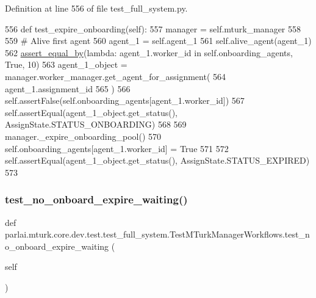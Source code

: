Definition at line 556 of file test\+\_\+full\+\_\+system.\+py.


\begin{DoxyCode}
556     \textcolor{keyword}{def }test\_expire\_onboarding(self):
557         manager = self.mturk\_manager
558 
559         \textcolor{comment}{# Alive first agent}
560         agent\_1 = self.agent\_1
561         self.alive\_agent(agent\_1)
562         \hyperlink{namespaceparlai_1_1mturk_1_1core_1_1test_1_1test__full__system_a0b463246d35658a2e422010f13dcf819}{assert\_equal\_by}(\textcolor{keyword}{lambda}: agent\_1.worker\_id \textcolor{keywordflow}{in} self.onboarding\_agents, \textcolor{keyword}{True}, 10)
563         agent\_1\_object = manager.worker\_manager.get\_agent\_for\_assignment(
564             agent\_1.assignment\_id
565         )
566         self.assertFalse(self.onboarding\_agents[agent\_1.worker\_id])
567         self.assertEqual(agent\_1\_object.get\_status(), AssignState.STATUS\_ONBOARDING)
568 
569         manager.\_expire\_onboarding\_pool()
570         self.onboarding\_agents[agent\_1.worker\_id] = \textcolor{keyword}{True}
571 
572         self.assertEqual(agent\_1\_object.get\_status(), AssignState.STATUS\_EXPIRED)
573 
\end{DoxyCode}
\mbox{\label{classparlai_1_1mturk_1_1core_1_1dev_1_1test_1_1test__full__system_1_1TestMTurkManagerWorkflows_aea7f86b35f032a0f71f92b6e1a207a61}} 
\subsubsection{\texorpdfstring{test\+\_\+no\+\_\+onboard\+\_\+expire\+\_\+waiting()}{test\_no\_onboard\_expire\_waiting()}}
{\footnotesize\ttfamily def parlai.\+mturk.\+core.\+dev.\+test.\+test\+\_\+full\+\_\+system.\+Test\+M\+Turk\+Manager\+Workflows.\+test\+\_\+no\+\_\+onboard\+\_\+expire\+\_\+waiting (\begin{DoxyParamCaption}\item[{}]{self }\end{DoxyParamCaption})}



